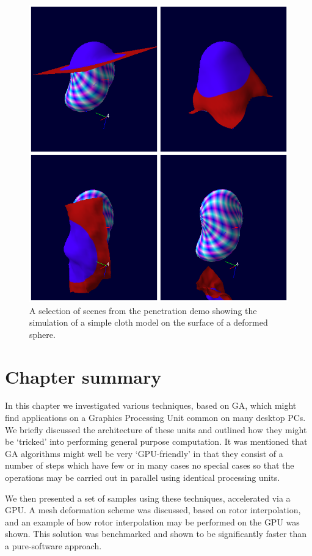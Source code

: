 \begin{figure}[p]
\centering
\includegraphics[width=\textwidth]{cloth_montage}
\caption{\label{fig:cloth_montage}%
  A selection of scenes from the penetration demo showing the
  simulation of a simple cloth model on the surface of a deformed
  sphere.
}
\end{figure}

\section{Chapter summary}

In this chapter we investigated various techniques, based on GA, which might
find applications on a Graphics Processing Unit common on many desktop PCs. We
briefly discussed the architecture of these units and outlined how they
might be `tricked' into performing general purpose computation. It was mentioned
that GA algorithms might well be very `GPU-friendly' in that they consist of
a number of steps which have few or in many cases no special cases so that the
operations may be carried out in parallel using identical processing units.

We then presented a set of samples using these techniques, accelerated via
a GPU. A mesh deformation scheme was discussed, based on rotor interpolation, and
an example of how rotor interpolation may be performed on the GPU was shown. This
solution was benchmarked and shown to be significantly faster than a pure-software approach.

